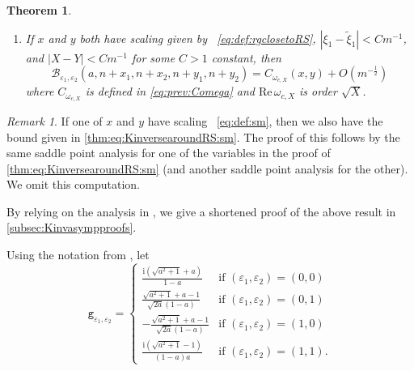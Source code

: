 \documentclass[11pt,twoside]{amsart}
\theoremstyle{plain}
\newtheorem{thm}{Theorem}[section]
\numberwithin{quest}{section}
\theoremstyle{remark}
\newtheorem{rem}{Remark}
\numberwithin{rem}{section}
\theoremstyle{definition}
\newcommand{\eps}{\varepsilon}
\begin{document}
\begin{thm}
\begin{enumerate}
			\item If $x$ and $y$ both have scaling given by ~\eqref{eq:def:rgclosetoRS}, $|\xi_1-\tilde{\xi}_1|<Cm^{-1}$, and $|X-Y|<Cm^{-1}$ for some $C>1$ constant, then
			\begin{equation}\label{eq:thm:KinversearoundRS:rough}
				\mathcal{B}_{\eps_1,\eps_2}(a,n+x_1,n+x_2,n+y_1,n+y_2)= C_{\omega_{c,X}}(x,y)+O(m^{-\frac{1}{2}})
			\end{equation}
			where $C_{\omega_{c,X}}$ is defined in \eqref{eq:prev:Comega} and $\mathrm{Re}\,\omega_{c,X}$ is order $\sqrt{X}$. 
		\end{enumerate}
		
	\end{thm}
	
	\begin{rem}\label{rem:mixedterm}
		If one of $x$ and $y$ have scaling ~\eqref{eq:def:sm}, then we also have the bound given in \eqref{thm:eq:KinversearoundRS:sm}. The proof of this follows by the same saddle point analysis for one of the variables in the proof of \eqref{thm:eq:KinversearoundRS:sm} (and another saddle point analysis for the other).  We omit this computation. 
	\end{rem}
	
	By relying on the analysis in \cite{CJ16}, we give a shortened proof of the above result in  \cref{subsec:Kinvasympproofs}.

Using the notation from \cite{CJ16}, let
	\begin{equation*}
		\mathtt{g}_{\eps_1,\eps_2} =
		\left\{
		\begin{array}{ll}
			\frac{\mathrm{i} \left(\sqrt{a^2+1}+a\right)}{1-a}
			&  \mbox{if } (\eps_1,\eps_2)=(0,0) \\
			\frac{\sqrt{a^2+1}+a-1}{\sqrt{2a} (1-a) }
			& \mbox{if } (\eps_1,\eps_2)=(0,1) \\
			-\frac{\sqrt{a^2+1}+a-1}{\sqrt{2a} (1-a) }
			&\mbox{if } (\eps_1,\eps_2)=(1,0)\\
			\frac{\mathrm{i}\left(\sqrt{a^2+1}-1\right)}{(1-a) a}
			&\mbox{if } (\eps_1,\eps_2)=(1,1).
		\end{array}
		\right.
	\end{equation*}
    
\end{document}
